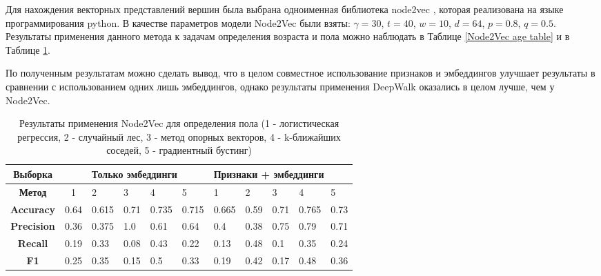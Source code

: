 Для нахождения векторных представлений вершин была выбрана одноименная библиотека node2vec \cite{node2vec lib}, которая реализована на языке программирования python.  В качестве параметров модели Node2Vec были взяты: $\gamma = 30$, $t = 40$, $w = 10$, $d = 64$, $p = 0.8$, $q = 0.5$. 
Результаты применения данного метода к задачам определения возраста и пола можно наблюдать в Таблице \ref{Node2Vec age table} и в Таблице \ref{Node2Vec gender table}. 

По полученным результатам можно сделать вывод, что в целом совместное использование признаков и эмбеддингов улучшает результаты в сравнении с использованием одних лишь эмбеддингов, однако результаты применения DeepWalk оказались в целом лучше, чем у Node2Vec.


\begin{table}[h!]
\centering
\begin{tabular}{|c|c|l|l|l|l|l|l|l|l|l|}
\hline
\textbf{Выборка}   & \multicolumn{5}{c|}{Только эмбеддинги} & \multicolumn{5}{l|}{Признаки + эмбеддинги} \\ \hline
\textbf{Метод}     & 1                      & 2 & 3 & 4 & 5 & 1      & 2      & 3      & 4      & 5      \\ \hline
\textbf{Accuracy}  &     0.64                   & 0.615  & 0.71   & 0.735  & 0.715  &   0.665     &  0.59      &0.71        & 0.765        &  0.73      \\ \hline
\textbf{Precision} &       0.36                &  0.375 & 1.0  & 0.61  & 0.64  &     0.4   &   0.38     &   0.75     &  0.79      & 0.71       \\ \hline
\textbf{Recall}    &      0.19                  & 0.33  & 0.08   & 0.43  & 0.22  &    0.13    &   0.48     &  0.1       &       0.35  &   0.24    \\ \hline
\textbf{F1}        &     0.25                    &  0.35 & 0.15   &  0.5 &  0.33 &    0.19    &     0.42   &   0.17     &  0.48      & 0.36        \\ \hline
\end{tabular}
\caption{Результаты применения Node2Vec для определения пола (1 - логистическая регрессия, 2 - случайный лес, 3 - метод опорных векторов, 4 - k-ближайших соседей, 5 - градиентный бустинг)}
\label{Node2Vec gender table}
\end{table}

\clearpage



